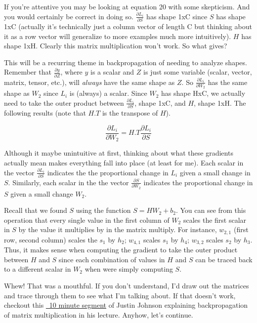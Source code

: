 \documentclass[12pt]{article}
\begin{document}
If you're attentive you may be looking at equation 20 with some skepticism. And you would certainly 
be correct in doing so. $\frac{\partial L_i}{\partial S}$ has shape 1xC since $S$ has shape 1xC
(actually it's technically just a column vector of length C but thinking about it as a row 
vector will generalize to more examples much more intuitively). $H$ has shape 1xH. Clearly this 
matrix multiplication won't work. So what gives?

This will be a recurring theme in backpropagation of needing to analyze shapes. Remember that 
$\frac{\partial y}{\partial Z}$, where $y$ is a scalar and $Z$ is just some variable 
(scalar,  vector, matrix, tensor, etc.), will \emph{always} have the same shape as $Z$. 
So $\frac{\partial L_i}{\partial W_2}$ has the same shape as $W_2$ since $L_i$ is (always) a scalar. 
Since $W_2$ has shape HxC, we actually need to take the outer product between $\frac{\partial L_i}{\partial S}$, 
shape 1xC, and $H$, shape 1xH. The following results (note that $H.T$ is the transpose of $H$).

\begin{equation}
    \frac{\partial L_i}{\partial W_2} =  H.T \frac{\partial L_i}{\partial S}
\end{equation}

Although it maybe unintuitive at first, thinking about what these gradients actually mean makes 
everything fall into place (at least for me). Each scalar in the vector $\frac{\partial L_i}{\partial S}$
indicates the the proportional change in $L_i$ given a small change in $S$. Similarly, each scalar in the 
the vector $\frac{\partial S}{\partial W_2}$ indicates the proportional change in $S$ given a small change 
$W_2$. 

Recall that we found $S$ using the function $S = HW_2 + b_2$. You can see from this operation that
every single value in the first column of $W_2$ scales the first scalar in $S$ by the value it multiplies
by in the matrix multiply. For instance, $w_{2, 1}$ (first row, second column) scales the $s_1$ by 
$h_2$; $w_{4, 1}$ scales $s_1$ by $h_4$; $w_{3, 2}$ scales $s_2$ by $h_3$. Thus, it makes sense when computing
the gradient to take the outer product between $H$ and $S$ since each combination of values in $H$ and 
$S$ can be traced back to a different scalar in $W_2$ when were simply computing $S$. 

Whew! That was a mouthful. If you don't understand, I'd draw out the matrices and trace through them to see 
what I'm talking about. If that doesn't work, checkout this \href{https://youtu.be/PBe2P05ljPw?t=3152}{~10 minute segment} of Justin Johnson explaining
backpropagation of matrix multiplication in his lecture. Anyhow, let's continue. 
\end{document}
